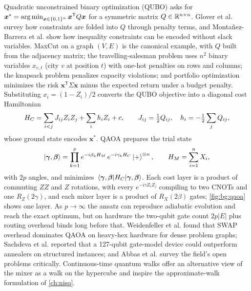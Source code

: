 Quadratic unconstrained binary optimization (QUBO) asks for $\bm{x}^{\ast}=\operatorname*{arg\,min}_{\bm{x}\in\{0,1\}^n}\bm{x}^{\mathsf{T}}Q\bm{x}$ for a symmetric matrix $Q\in\mathbb{R}^{n\times n}$. Glover et al. \cite{glover2018qubo} survey how constraints are folded into $Q$ through penalty terms, and Monta{\~n}ez-Barrera et al. \cite{montanezbarrera2024unbalanced} show how inequality constraints can be encoded without slack variables. MaxCut on a graph $(V,E)$ is the canonical example, with $Q$ built from the adjacency matrix; the travelling-salesman problem uses $n^2$ binary variables $x_{v,t}$ (city $v$ at position $t$) with one-hot penalties on rows and columns; the knapsack problem penalizes capacity violations; and portfolio optimization minimizes the risk $\bm{x}^{\mathsf{T}}\Sigma\bm{x}$ minus the expected return under a budget penalty. Substituting $x_i=(1-Z_i)/2$ converts the QUBO objective into a diagonal cost Hamiltonian
\begin{equation}\label{eq:bg:hcost}
H_C=\sum_{i<j}J_{ij}Z_iZ_j+\sum_{i}h_iZ_i+c,\qquad J_{ij}=\tfrac12Q_{ij},\quad h_i=-\tfrac12\sum_{j}Q_{ij},
\end{equation}
whose ground state encodes $\bm{x}^{\ast}$. QAOA \cite{farhi2014qaoa} prepares the trial state
\begin{equation}\label{eq:bg:qaoa}
\ket{\bm{\gamma},\bm{\beta}}=\prod_{k=1}^{p}e^{-i\beta_kH_M}\,e^{-i\gamma_kH_C}\ket{+}^{\otimes n},\qquad H_M=\sum_{i=1}^{n}X_i,
\end{equation}
with $2p$ angles, and minimizes $\expval{H_C}{\bm{\gamma},\bm{\beta}}$. Each cost layer is a product of commuting $ZZ$ and $Z$ rotations, with every $e^{-i\gamma Z_iZ_j}$ compiling to two CNOTs and one $R_Z(2\gamma)$, and each mixer layer is a product of $R_X(2\beta)$ gates; \cref{fig:bg:qaoa} shows one layer. As $p\to\infty$ the ansatz can reproduce adiabatic evolution and reach the exact optimum, but on hardware the two-qubit gate count $2p|E|$ plus routing overhead binds long before that. Weidenfeller et al. \cite{weidenfeller2022qaoascaling} found that SWAP overhead dominates QAOA on heavy-hex hardware for dense problem graphs; Sachdeva et al. \cite{sachdeva2024qaoa127} reported that a 127-qubit gate-model device could outperform annealers on structured instances; and Abbas et al. \cite{abbas2024challengesqopt} survey the field's open problems critically. Continuous-time quantum walks \cite{childs2009quantumwalk} offer an alternative view of the mixer as a walk on the hypercube and inspire the approximate-walk formulation of \cref{ch:nisq}.


